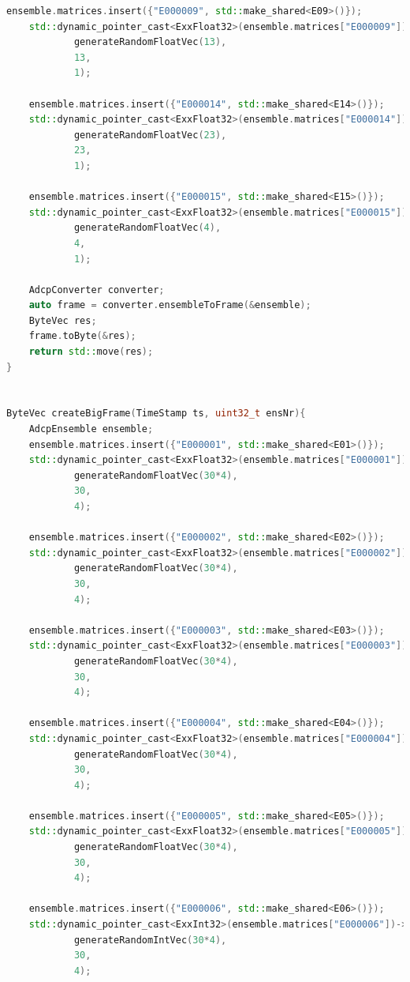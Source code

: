 \begin{lstlisting}[language=C++]
    ensemble.matrices.insert({"E000009", std::make_shared<E09>()});
    std::dynamic_pointer_cast<ExxFloat32>(ensemble.matrices["E000009"])->setVector(
            generateRandomFloatVec(13),
            13,
            1);

    ensemble.matrices.insert({"E000014", std::make_shared<E14>()});
    std::dynamic_pointer_cast<ExxFloat32>(ensemble.matrices["E000014"])->setVector(
            generateRandomFloatVec(23),
            23,
            1);

    ensemble.matrices.insert({"E000015", std::make_shared<E15>()});
    std::dynamic_pointer_cast<ExxFloat32>(ensemble.matrices["E000015"])->setVector(
            generateRandomFloatVec(4),
            4,
            1);

    AdcpConverter converter;
    auto frame = converter.ensembleToFrame(&ensemble);
    ByteVec res;
    frame.toByte(&res);
    return std::move(res);
}


ByteVec createBigFrame(TimeStamp ts, uint32_t ensNr){
    AdcpEnsemble ensemble;
    ensemble.matrices.insert({"E000001", std::make_shared<E01>()});
    std::dynamic_pointer_cast<ExxFloat32>(ensemble.matrices["E000001"])->setVector(
            generateRandomFloatVec(30*4),
            30,
            4);

    ensemble.matrices.insert({"E000002", std::make_shared<E02>()});
    std::dynamic_pointer_cast<ExxFloat32>(ensemble.matrices["E000002"])->setVector(
            generateRandomFloatVec(30*4),
            30,
            4);

    ensemble.matrices.insert({"E000003", std::make_shared<E03>()});
    std::dynamic_pointer_cast<ExxFloat32>(ensemble.matrices["E000003"])->setVector(
            generateRandomFloatVec(30*4),
            30,
            4);

    ensemble.matrices.insert({"E000004", std::make_shared<E04>()});
    std::dynamic_pointer_cast<ExxFloat32>(ensemble.matrices["E000004"])->setVector(
            generateRandomFloatVec(30*4),
            30,
            4);

    ensemble.matrices.insert({"E000005", std::make_shared<E05>()});
    std::dynamic_pointer_cast<ExxFloat32>(ensemble.matrices["E000005"])->setVector(
            generateRandomFloatVec(30*4),
            30,
            4);

    ensemble.matrices.insert({"E000006", std::make_shared<E06>()});
    std::dynamic_pointer_cast<ExxInt32>(ensemble.matrices["E000006"])->setVector(
            generateRandomIntVec(30*4),
            30,
            4);


\end{lstlisting}
